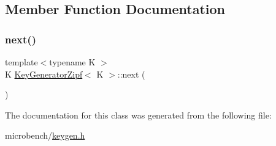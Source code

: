 \subsection{Member Function Documentation}
\mbox{\label{classKeyGeneratorZipf_aaefdd0a14c9380d8cf266ae235002c1b}} 
\subsubsection{\texorpdfstring{next()}{next()}}
{\footnotesize\ttfamily template$<$typename K $>$ \\
K \hyperlink{classKeyGeneratorZipf}{Key\+Generator\+Zipf}$<$ K $>$\+::next (\begin{DoxyParamCaption}{ }\end{DoxyParamCaption})\hspace{0.3cm}{\ttfamily [inline]}}



The documentation for this class was generated from the following file\+:\begin{DoxyCompactItemize}
\item 
microbench/\hyperlink{keygen_8h}{keygen.\+h}\end{DoxyCompactItemize}
